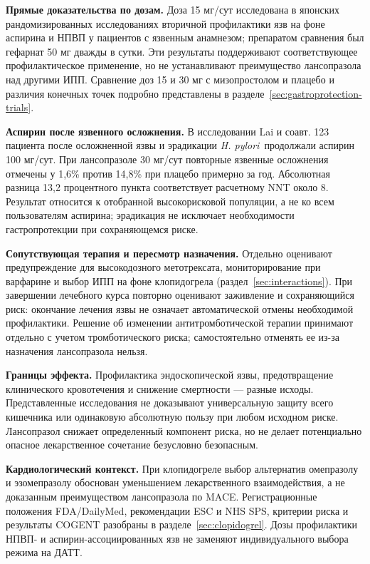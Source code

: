 \documentclass[11pt,a4paper,notitlepage]{report}
\newcommand{\Hp}{\textit{H. pylori}}
\newcommand{\src}[1]{\unskip\space\cite{#1}}
\begin{document}
\textbf{Прямые доказательства по дозам.} Доза 15 мг/сут исследована в японских рандомизированных исследованиях вторичной профилактики язв на фоне аспирина и НПВП у пациентов с язвенным анамнезом; препаратом сравнения был гефарнат 50 мг дважды в сутки. Эти результаты поддерживают соответствующее профилактическое применение, но не устанавливают преимущество лансопразола над другими ИПП. Сравнение доз 15 и 30 мг с мизопростолом и плацебо и различия конечных точек подробно представлены в разделе~\ref{sec:gastroprotection-trials}.\src{aspirin15,nsaid15,misotrial}

\textbf{Аспирин после язвенного осложнения.} В исследовании Lai и соавт. 123 пациента после осложненной язвы и эрадикации \Hp\ продолжали аспирин 100 мг/сут. При лансопразоле 30 мг/сут повторные язвенные осложнения отмечены у 1,6\% против 14,8\% при плацебо примерно за год. Абсолютная разница 13,2 процентного пункта соответствует расчетному NNT около 8. Результат относится к отобранной высокорисковой популяции, а не ко всем пользователям аспирина; эрадикация не исключает необходимости гастропротекции при сохраняющемся риске.\src{aspirintrial}

\textbf{Сопутствующая терапия и пересмотр назначения.} Отдельно оценивают предупреждение для высокодозного метотрексата, мониторирование при варфарине и выбор ИПП на фоне клопидогрела (раздел~\ref{sec:interactions}). При завершении лечебного курса повторно оценивают заживление и сохраняющийся риск: окончание лечения язвы не означает автоматической отмены необходимой профилактики. Решение об изменении антитромботической терапии принимают отдельно с учетом тромботического риска; самостоятельно отменять ее из-за назначения лансопразола нельзя.\src{uslabel,sps,nice,agadepres,esge2026}

\textbf{Границы эффекта.} Профилактика эндоскопической язвы, предотвращение клинического кровотечения и снижение смертности --- разные исходы. Представленные исследования не доказывают универсальную защиту всего кишечника или одинаковую абсолютную пользу при любом исходном риске. Лансопразол снижает определенный компонент риска, но не делает потенциально опасное лекарственное сочетание безусловно безопасным.\src{aspirintrial,misotrial,aspirin15,nsaid15}

\textbf{Кардиологический контекст.} При клопидогреле выбор альтернатив омепразолу и эзомепразолу обоснован уменьшением лекарственного взаимодействия, а не доказанным преимуществом лансопразола по MACE. Регистрационные положения FDA/DailyMed, рекомендации ESC и NHS SPS, критерии риска и результаты COGENT разобраны в разделе~\ref{sec:clopidogrel}. Дозы профилактики НПВП- и аспирин-ассоциированных язв не заменяют индивидуального выбора режима на ДАТТ.\src{cardioplavix2025,cardioesc2023,cardioesc2024,sps}
\end{document}
